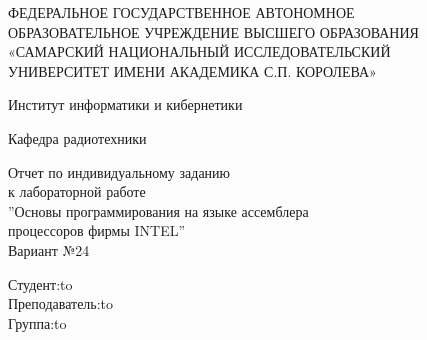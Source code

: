 \begin{titlepage}
\newpage
\doublespacing
\begin{center}
ФЕДЕРАЛЬНОЕ ГОСУДАРСТВЕННОЕ АВТОНОМНОЕ\\
ОБРАЗОВАТЕЛЬНОЕ УЧРЕЖДЕНИЕ ВЫСШЕГО ОБРАЗОВАНИЯ\\
«САМАРСКИЙ НАЦИОНАЛЬНЫЙ ИССЛЕДОВАТЕЛЬСКИЙ\\
УНИВЕРСИТЕТ ИМЕНИ АКАДЕМИКА С.П. КОРОЛЕВА»	
 \\
\end{center}

\vspace{5em}

\begin{center}
 Институт информатики и кибернетики \\ 
\end{center}

\begin{center}
Кафедра радиотехники \\ 
\end{center}


\vspace{3em}

\begin{center}
{Отчет по индивидуальному заданию \\к лабораторной работе\\''Основы программирования на языке ассемблера \\процессоров фирмы INTEL''\\Вариант №24}
\end{center}

\vspace{10em}
\newbox{\lbox}
\newlength{\maxl}
\setlength{\maxl}{\wd\lbox}
\hfill\parbox{7cm}{
\hspace*{4cm}\hspace*{-4cm}Студент:\hfill\hbox to\\
\hspace*{4cm}\hspace*{-4cm}Преподаватель:\hfill\hbox to\\
\hspace*{4cm}\hspace*{-4cm}Группа:\hfill\hbox to\\
}


\end{titlepage}

